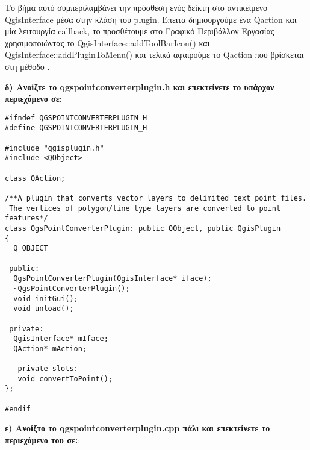 Το βήμα αυτό συμπεριλαμβάνει την πρόσθεση ενός δείκτη στο αντικείμενο QgisInterface μέσα στην κλάση του plugin. Έπειτα δημιουργούμε ένα Qaction και μία λειτουργία callback, το προσθέτουμε στο Γραφικό Περιβάλλον Εργασίας χρησιμοποιώντας το QgisInterface::addToolBarIcon() και QgisInterface::addPluginToMenu()
και τελικά αφαιρούμε το Qaction που βρίσκεται στη μέθοδο .

\textbf{δ) Ανοίξτε το qgspointconverterplugin.h και επεκτείνετε το υπάρχον περιεχόμενο σε}:

\begin{verbatim}
#ifndef QGSPOINTCONVERTERPLUGIN_H
#define QGSPOINTCONVERTERPLUGIN_H

#include "qgisplugin.h"
#include <QObject>

class QAction;

/**A plugin that converts vector layers to delimited text point files.
 The vertices of polygon/line type layers are converted to point features*/
class QgsPointConverterPlugin: public QObject, public QgisPlugin
{
  Q_OBJECT

 public:
  QgsPointConverterPlugin(QgisInterface* iface);
  ~QgsPointConverterPlugin();
  void initGui();
  void unload();
  
 private:
  QgisInterface* mIface;
  QAction* mAction;
  
   private slots:
   void convertToPoint();
};

#endif
\end{verbatim}

\textbf{ε) Ανοίξτο το qgspointconverterplugin.cpp πάλι και επεκτείνετε το περιεχόμενο του σε:}:

